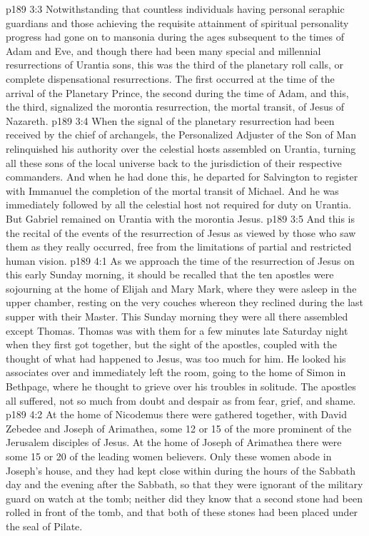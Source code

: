 \vs p189 3:3 Notwithstanding that countless individuals having personal seraphic guardians and those achieving the requisite attainment of spiritual personality progress had gone on to mansonia during the ages subsequent to the times of Adam and Eve, and though there had been many special and millennial resurrections of Urantia sons, this was the third of the planetary roll calls, or complete dispensational resurrections. The first occurred at the time of the arrival of the Planetary Prince, the second during the time of Adam, and this, the third, signalized the morontia resurrection, the mortal transit, of Jesus of Nazareth.
\vs p189 3:4 \pc When the signal of the planetary resurrection had been received by the chief of archangels, the Personalized Adjuster of the Son of Man relinquished his authority over the celestial hosts assembled on Urantia, turning all these sons of the local universe back to the jurisdiction of their respective commanders. And when he had done this, he departed for Salvington to register with Immanuel the completion of the mortal transit of Michael. And he was immediately followed by all the celestial host not required for duty on Urantia. But Gabriel remained on Urantia with the morontia Jesus.
\vs p189 3:5 \pc And this is the recital of the events of the resurrection of Jesus as viewed by those who saw them as they really occurred, free from the limitations of partial and restricted human vision.
\vs p189 4:1 As we approach the time of the resurrection of Jesus on this early Sunday morning, it should be recalled that the ten apostles were sojourning at the home of Elijah and Mary Mark, where they were asleep in the upper chamber, resting on the very couches whereon they reclined during the last supper with their Master. This Sunday morning they were all there assembled except Thomas. Thomas was with them for a few minutes late Saturday night when they first got together, but the sight of the apostles, coupled with the thought of what had happened to Jesus, was too much for him. He looked his associates over and immediately left the room, going to the home of Simon in Bethpage, where he thought to grieve over his troubles in solitude. The apostles all suffered, not so much from doubt and despair as from fear, grief, and shame.
\vs p189 4:2 \pc At the home of Nicodemus there were gathered together, with David Zebedee and Joseph of Arimathea, some 12 or 15 of the more prominent of the Jerusalem disciples of Jesus. At the home of Joseph of Arimathea there were some 15 or 20 of the leading women believers. Only these women abode in Joseph’s house, and they had kept close within during the hours of the Sabbath day and the evening after the Sabbath, so that they were ignorant of the military guard on watch at the tomb; neither did they know that a second stone had been rolled in front of the tomb, and that both of these stones had been placed under the seal of Pilate.
